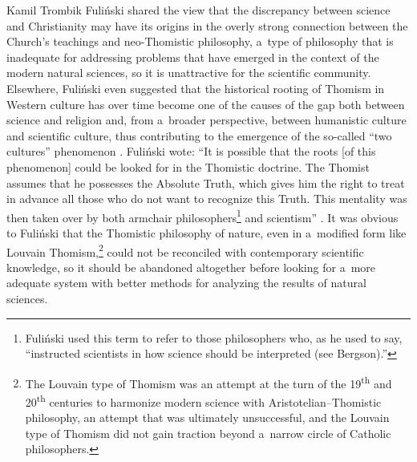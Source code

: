 \begin{artengenv}{Kamil Trombik}
Fuliński shared the view that the discrepancy between science and Christianity may have its origins in the overly strong connection between the Church's teachings and neo-Thomistic philosophy, a~type of philosophy that is inadequate for addressing problems that have emerged in the context of the modern natural sciences, so it is unattractive for the scientific community. Elsewhere, Fuliński even suggested that the historical rooting of Thomism in Western culture has over time become one of the causes of the gap both between science and religion and, from a~broader perspective, between humanistic culture and scientific culture, thus contributing to the emergence of the so-called ``two cultures'' phenomenon 
\parencite[][]{snow_two_1959}. %
 Fuliński wote: ``It is possible that the roots [of this phenomenon] could be looked for in the Thomistic doctrine. The Thomist assumes that he possesses the Absolute Truth, which gives him the right to treat in advance all those who do not want to recognize this Truth. This mentality was then taken over by both armchair philosophers\footnote{Fuliński used this term to refer to those philosophers who, as he used to say, ``instructed scientists in how science should be interpreted (see Bergson).''} and scientism''
\parencite[][p.32]{fulinski_o_1993}. %
 It was obvious to Fuliński that the Thomistic philosophy of nature, even in a~modified form like Louvain Thomism,\footnote{The Louvain type of Thomism was an attempt at the turn of the 19\textsuperscript{th} and 20\textsuperscript{th} centuries to harmonize modern science with Aristotelian–Thomistic philosophy, an attempt that was ultimately unsuccessful, and the Louvain type of Thomism did not gain traction beyond a~narrow circle of Catholic philosophers. } could not be reconciled with contemporary scientific knowledge, so it should be abandoned altogether before looking for a~more adequate system with better methods for analyzing the results of natural sciences.




\end{artengenv}
